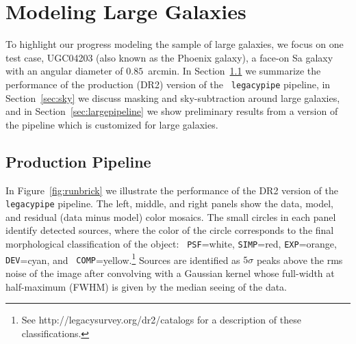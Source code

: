 \section{Modeling Large Galaxies}\label{sec:modeling}

To highlight our progress modeling the sample of large galaxies, we focus on one
test case, UGC04203 (also known as the Phoenix galaxy), a face-on Sa galaxy with
an angular diameter of $0.85$~arcmin.  In Section~\ref{sec:production} we
summarize the performance of the production (DR2) version of the {\tt
  legacypipe} pipeline, in Section~\ref{sec:sky} we discuss masking and
sky-subtraction around large galaxies, and in Section~\ref{sec:largepipeline} we
show preliminary results from a version of the pipeline which is customized for
large galaxies.


\subsection{Production Pipeline}\label{sec:production}

In Figure~\ref{fig:runbrick} we illustrate the performance of the DR2 version of
the {\tt legacypipe} pipeline.  The left, middle, and right panels show the
data, model, and residual (data minus model) color mosaics.  The small circles
in each panel identify detected sources, where the color of the circle
corresponds to the final morphological classification of the object: {\tt
  PSF}=white, {\tt SIMP}=red, {\tt EXP}=orange, {\tt DEV}=cyan, and {\tt
  COMP}=yellow.\footnote{See http://legacysurvey.org/dr2/catalogs for a
  description of these classifications.}  Sources are identified as $5 \sigma$
peaks above the rms noise of the image after convolving with a Gaussian kernel
whose full-width at half-maximum (FWHM) is given by the median seeing of the
data. 

